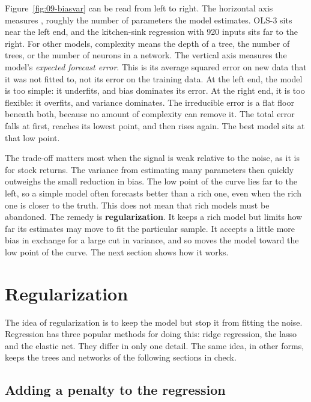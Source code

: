 Figure~\ref{fig:09-biasvar} can be read from left to right. The horizontal axis measures , roughly the number of parameters the model estimates. OLS-3 sits near the left end, and the kitchen-sink regression with 920 inputs sits far to the right. For other models, complexity means the depth of a tree, the number of trees, or the number of neurons in a network. The vertical axis measures the model's \emph{expected forecast error}. This is its average squared error on new data that it was not fitted to, not its error on the training data. At the left end, the model is too simple: it underfits, and bias dominates its error. At the right end, it is too flexible: it overfits, and variance dominates. The irreducible error is a flat floor beneath both, because no amount of complexity can remove it. The total error falls at first, reaches its lowest point, and then rises again. The best model sits at that low point.

The trade-off matters most when the signal is weak relative to the noise, as it is for stock returns. The variance from estimating many parameters then quickly outweighs the small reduction in bias. The low point of the curve lies far to the left, so a simple model often forecasts better than a rich one, even when the rich one is closer to the truth. This does not mean that rich models must be abandoned. The remedy is \textbf{regularization}. It keeps a rich model but limits how far its estimates may move to fit the particular sample. It accepts a little more bias in exchange for a large cut in variance, and so moves the model toward the low point of the curve. The next section shows how it works.

\section{Regularization}
\label{sec:20-models}
\label{sec:20-shrinkage}

The idea of regularization is to keep the model but stop it from fitting the noise. Regression has three popular methods for doing this: ridge regression, the lasso and the elastic net. They differ in only one detail. The same idea, in other forms, keeps the trees and networks of the following sections in check.

\subsection{Adding a penalty to the regression}

